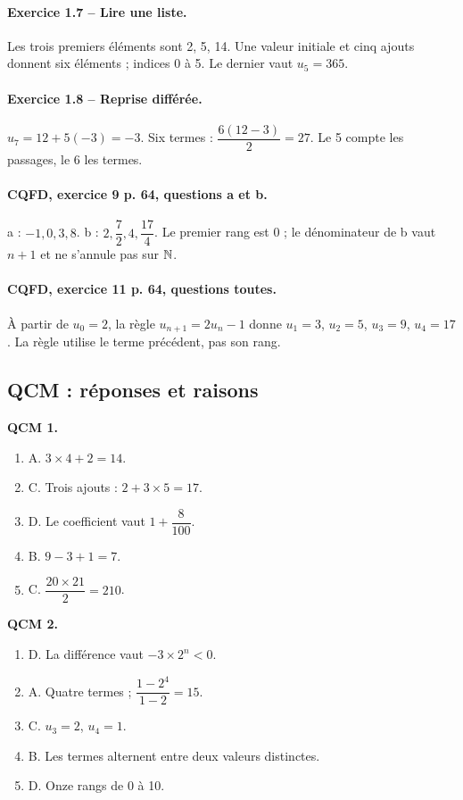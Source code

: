 \paragraph{Exercice 1.7 -- Lire une liste.} Les trois premiers éléments sont 2, 5, 14. Une valeur initiale et cinq ajouts donnent six éléments ; indices 0 à 5. Le dernier vaut $u_5=365$.
\paragraph{Exercice 1.8 -- Reprise différée.} $u_7=12+5(-3)=-3$. Six termes : $\dfrac{6(12-3)}{2}=27$. Le 5 compte les passages, le 6 les termes.
\paragraph{CQFD, exercice 9 p. 64, questions a et b.} a : $-1,0,3,8$. b : $2,\dfrac72,4,\dfrac{17}4$. Le premier rang est 0 ; le dénominateur de b vaut $n+1$ et ne s’annule pas sur $\mathbb N$.
\paragraph{CQFD, exercice 11 p. 64, questions toutes.} À partir de $u_0=2$, la règle $u_{n+1}=2u_n-1$ donne $u_1=3$, $u_2=5$, $u_3=9$, $u_4=17$. La règle utilise le terme précédent, pas son rang.
\subsection*{QCM : réponses et raisons}
\textbf{QCM 1.}
\begin{enumerate}
\item A. $3\times4+2=14$.
\item C. Trois ajouts : $2+3\times5=17$.
\item D. Le coefficient vaut $1+\dfrac{8}{100}$.
\item B. $9-3+1=7$.
\item C. $\dfrac{20\times 21}{2}=210$.
\end{enumerate}
\textbf{QCM 2.}
\begin{enumerate}
\item D. La différence vaut $-3\times2^n<0$.
\item A. Quatre termes ; $\dfrac{1-2^4}{1-2}=15$.
\item C. $u_3=2$, $u_4=1$.
\item B. Les termes alternent entre deux valeurs distinctes.
\item D. Onze rangs de 0 à 10.
\end{enumerate}
